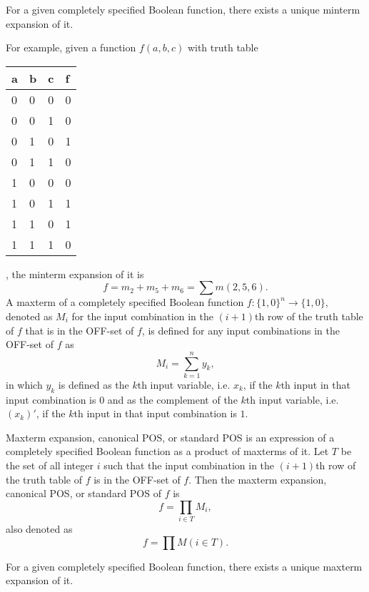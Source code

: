 \documentclass[a4paper,12pt]{article}
\begin{document}
\begin{itemize}
\begin{itemize}
\begin{itemize}
\begin{itemize}
\begin{itemize}
\begin{itemize}
\begin{itemize}
For a given completely specified Boolean function, there exists a unique minterm expansion of it.

For example, given a function $f(a,b,c)$ with truth table
\begin{longtable}[c]{|m|m|m|m|}
\hline
a & b & c & f\\\hline
0 & 0 & 0 & 0\\\hline
0 & 0 & 1 & 0\\\hline
0 & 1 & 0 & 1\\\hline
0 & 1 & 1 & 0\\\hline
1 & 0 & 0 & 0\\\hline
1 & 0 & 1 & 1\\\hline
1 & 1 & 0 & 1\\\hline
1 & 1 & 1 & 0\\\hline
\end{longtable}
, the minterm expansion of it is
\[f=m_2+m_5+m_6=\sum m(2,5,6).\]
A maxterm of a completely specified Boolean function $f\colon\{1,0\}^n\to\{1,0\}$, denoted as $M_i$ for the input combination in the $(i+1)$th row of the truth table of $f$ that is in the OFF-set of $f$, is defined for any input combinations in the OFF-set of $f$ as
\[M_i=\sum_{k=1}^ny_k,\]
in which $y_k$ is defined as the $k$th input variable, i.e. $x_k$, if the $k$th input in that input combination is $0$ and as the complement of the $k$th input variable, i.e. $(x_k)'$, if the $k$th input in that input combination is $1$.

Maxterm expansion, canonical POS, or standard POS is an expression of a completely specified Boolean function as a product of maxterms of it. Let $T$ be the set of all integer $i$ such that the input combination in the $(i+1)$th row of the truth table of $f$ is in the OFF-set of $f$. Then the maxterm expansion, canonical POS, or standard POS of $f$ is
\[f=\prod_{i\in T}M_i,\]
also denoted as 
\[f=\prod M(i\in T).\]

For a given completely specified Boolean function, there exists a unique maxterm expansion of it.


\end{itemize}
\end{itemize}
\end{itemize}
\end{itemize}
\end{itemize}
\end{itemize}
\end{itemize}
\end{document}
